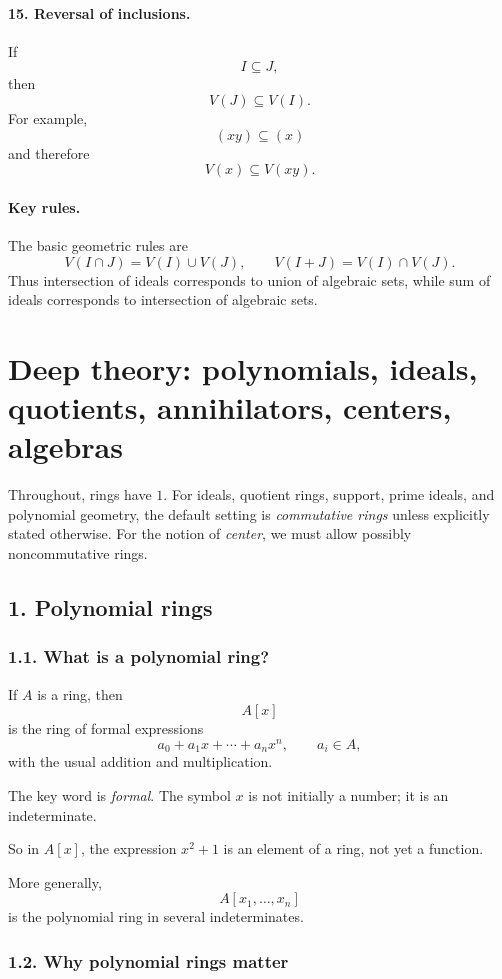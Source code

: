 \documentclass[12pt,a4paper]{article}
\theoremstyle{plain}
\theoremstyle{definition}      %
\begin{document}
	\paragraph{15. Reversal of inclusions.}
	If
	\[
	I\subseteq J,
	\]
	then
	\[
	V(J)\subseteq V(I).
	\]
	For example,
	\[
	(xy)\subseteq (x)
	\]
	and therefore
	\[
	V(x)\subseteq V(xy).
	\]
	
	\paragraph{Key rules.}
	The basic geometric rules are
	\[
	V(I\cap J)=V(I)\cup V(J),
	\qquad
	V(I+J)=V(I)\cap V(J).
	\]
	Thus intersection of ideals corresponds to union of algebraic sets, while sum of ideals corresponds to intersection of algebraic sets.
	
	\section*{Deep theory: polynomials, ideals, quotients, annihilators, centers, algebras}
	
	Throughout, rings have \(1\).
	For ideals, quotient rings, support, prime ideals, and polynomial geometry, the default setting is \emph{commutative rings} unless explicitly stated otherwise.
	For the notion of \emph{center}, we must allow possibly noncommutative rings.
	
	\subsection*{1. Polynomial rings}
	
	\subsubsection*{1.1. What is a polynomial ring?}
	
	If \(A\) is a ring, then
	\[
	A[x]
	\]
	is the ring of formal expressions
	\[
	a_0+a_1x+\cdots+a_nx^n,\qquad a_i\in A,
	\]
	with the usual addition and multiplication.
	
	The key word is \emph{formal}.
	The symbol \(x\) is not initially a number; it is an indeterminate.
	
	So in \(A[x]\), the expression \(x^2+1\) is an element of a ring, not yet a function.
	
	More generally,
	\[
	A[x_1,\dots,x_n]
	\]
	is the polynomial ring in several indeterminates.
	
	\subsubsection*{1.2. Why polynomial rings matter}
	
\end{document}
